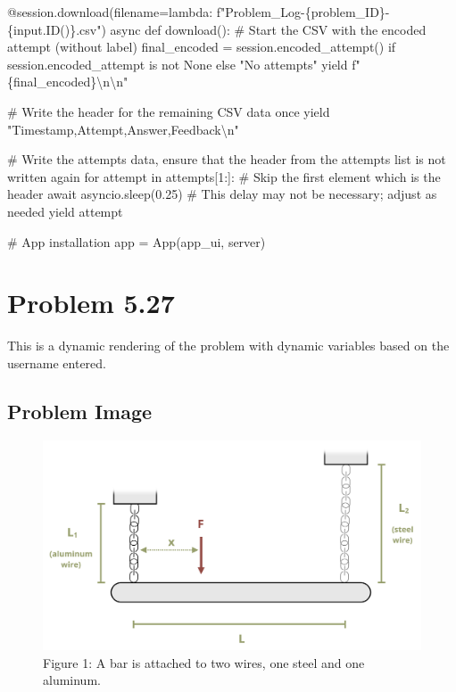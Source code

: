 \documentclass[
  letterpaper,
  DIV=11,
  numbers=noendperiod]{scrreprt}
\newenvironment{Shaded}{\begin{snugshade}}{\end{snugshade}}
\newcommand{\NormalTok}[1]{\textcolor[rgb]{0.00,0.23,0.31}{#1}}
\begin{document}
\begin{Shaded}
\begin{Highlighting}[]
\NormalTok{    @session.download(filename=lambda: f"Problem\_Log{-}\{problem\_ID\}{-}\{input.ID()\}.csv")}
\NormalTok{    async def download():}
\NormalTok{        \# Start the CSV with the encoded attempt (without label)}
\NormalTok{        final\_encoded = session.encoded\_attempt() if session.encoded\_attempt is not None else "No attempts"}
\NormalTok{        yield f"\{final\_encoded\}\textbackslash{}n\textbackslash{}n"}
        
\NormalTok{        \# Write the header for the remaining CSV data once}
\NormalTok{        yield "Timestamp,Attempt,Answer,Feedback\textbackslash{}n"}
        
\NormalTok{        \# Write the attempts data, ensure that the header from the attempts list is not written again}
\NormalTok{        for attempt in attempts[1:]:  \# Skip the first element which is the header}
\NormalTok{            await asyncio.sleep(0.25)  \# This delay may not be necessary; adjust as needed}
\NormalTok{            yield attempt}


\NormalTok{\# App installation}
\NormalTok{app = App(app\_ui, server)}
\end{Highlighting}
\end{Shaded}

\chapter*{Problem 5.27}\label{problem-5.27}


This is a dynamic rendering of the problem with dynamic variables based
on the username entered.

\section*{Problem Image}\label{problem-image-46}


\begin{figure}[H]

{\centering \includegraphics{images/191.png}

}

\caption{Figure 1: A bar is attached to two wires, one steel and one
aluminum.}

\end{figure}%
\end{document}
